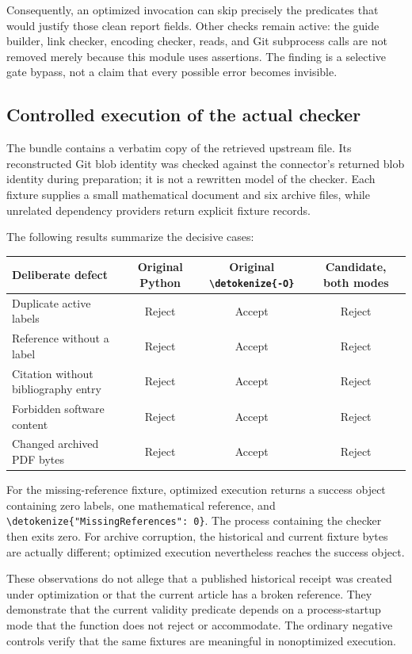 \documentclass[11pt,letterpaper]{article}
\newcommand{\code}[1]{\expandafter\nolinkurl\expandafter{\detokenize{#1}}}
\begin{document}
Consequently, an optimized invocation can skip precisely the predicates that would justify those clean report fields. Other checks remain active: the guide builder, link checker, encoding checker, reads, and Git subprocess calls are not removed merely because this module uses assertions. The finding is a selective gate bypass, not a claim that every possible error becomes invisible.

\subsection{Controlled execution of the actual checker}

The bundle contains a verbatim copy of the retrieved upstream file. Its reconstructed Git blob identity was checked against the connector's returned blob identity during preparation; it is not a rewritten model of the checker. Each fixture supplies a small mathematical document and six archive files, while unrelated dependency providers return explicit fixture records.

The following results summarize the decisive cases:

\begin{center}\small
\begin{tabularx}{\textwidth}{@{}Yccc@{}}
\toprule
Deliberate defect & Original Python & Original \code{-O} & Candidate, both modes\\
\midrule
Duplicate active labels & Reject & Accept & Reject\\
Reference without a label & Reject & Accept & Reject\\
Citation without bibliography entry & Reject & Accept & Reject\\
Forbidden software content & Reject & Accept & Reject\\
Changed archived PDF bytes & Reject & Accept & Reject\\
\bottomrule
\end{tabularx}
\end{center}

For the missing-reference fixture, optimized execution returns a success object containing zero labels, one mathematical reference, and \code{"MissingReferences": 0}. The process containing the checker then exits zero. For archive corruption, the historical and current fixture bytes are actually different; optimized execution nevertheless reaches the success object.

These observations do not allege that a published historical receipt was created under optimization or that the current article has a broken reference. They demonstrate that the current validity predicate depends on a process-startup mode that the function does not reject or accommodate. The ordinary negative controls verify that the same fixtures are meaningful in nonoptimized execution.
\end{document}
